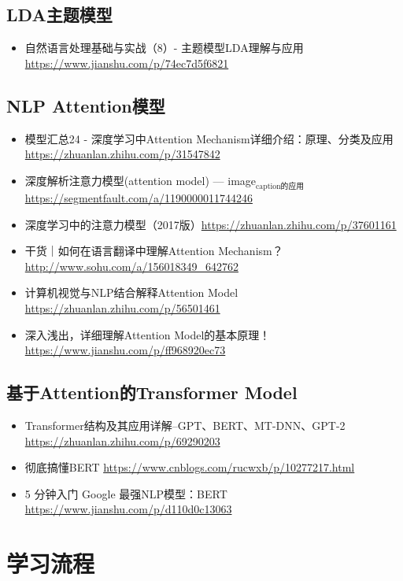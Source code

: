 \documentclass[11pt]{article}
\begin{document}
\subsection{LDA主题模型}
\label{sec-5-2}
\begin{itemize}
\item 自然语言处理基础与实战（8）- 主题模型LDA理解与应用 \url{https://www.jianshu.com/p/74ec7d5f6821}
\end{itemize}

\subsection{NLP Attention模型}
\label{sec-5-3}
\begin{itemize}
\item 模型汇总24 - 深度学习中Attention Mechanism详细介绍：原理、分类及应用 \url{https://zhuanlan.zhihu.com/p/31547842}
\item 深度解析注意力模型(attention model) --- image$_{\text{caption的应用}}$ \url{https://segmentfault.com/a/1190000011744246}
\item 深度学习中的注意力模型（2017版）\url{https://zhuanlan.zhihu.com/p/37601161}
\item 干货｜如何在语言翻译中理解Attention Mechanism？ \url{http://www.sohu.com/a/156018349_642762}
\item 计算机视觉与NLP结合解释Attention Model \url{https://zhuanlan.zhihu.com/p/56501461}
\item 深入浅出，详细理解Attention Model的基本原理！ \url{https://www.jianshu.com/p/ff968920ec73}
\end{itemize}

\subsection{基于Attention的Transformer Model}
\label{sec-5-4}
\begin{itemize}
\item Transformer结构及其应用详解--GPT、BERT、MT-DNN、GPT-2 \url{https://zhuanlan.zhihu.com/p/69290203}
\item 彻底搞懂BERT \url{https://www.cnblogs.com/rucwxb/p/10277217.html}
\item 5 分钟入门 Google 最强NLP模型：BERT \url{https://www.jianshu.com/p/d110d0c13063}
\end{itemize}

\section{学习流程}
\label{sec-6}
\end{document}

